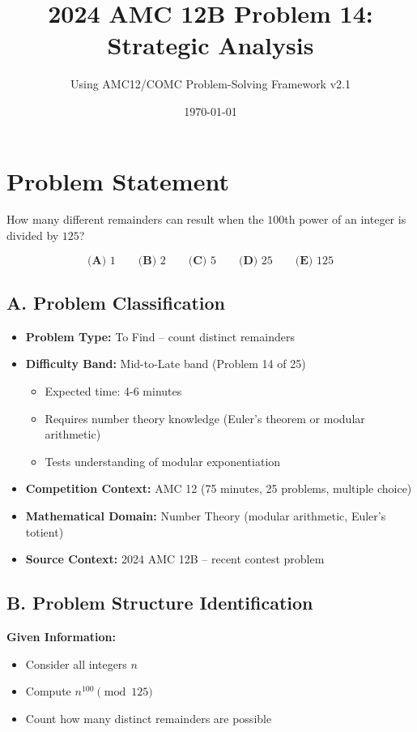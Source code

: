 \documentclass[12pt]{article}
\title{\textbf{2024 AMC 12B Problem 14:\\Strategic Analysis}}
\author{Using AMC12/COMC Problem-Solving Framework v2.1}
\date{\today}
\begin{document}
\maketitle

\section*{Problem Statement}

How many different remainders can result when the $100$th power of an integer is divided by $125$?

\[
\textbf{(A) } 1 \qquad 
\textbf{(B) } 2 \qquad 
\textbf{(C) } 5 \qquad 
\textbf{(D) } 25 \qquad 
\textbf{(E) } 125
\]

\vspace{1em}

\begin{problemconfigbox}
\subsection*{A. Problem Classification}

\begin{itemize}[leftmargin=*]
    \item \textbf{Problem Type:} To Find -- count distinct remainders
    \item \textbf{Difficulty Band:} Mid-to-Late band (Problem 14 of 25)
    \begin{itemize}
        \item Expected time: 4-6 minutes
        \item Requires number theory knowledge (Euler's theorem or modular arithmetic)
        \item Tests understanding of modular exponentiation
    \end{itemize}
    \item \textbf{Competition Context:} AMC 12 (75 minutes, 25 problems, multiple choice)
    \item \textbf{Mathematical Domain:} Number Theory (modular arithmetic, Euler's totient)
    \item \textbf{Source Context:} 2024 AMC 12B -- recent contest problem
\end{itemize}

\subsection*{B. Problem Structure Identification}

\textbf{Given Information:}
\begin{itemize}
    \item Consider all integers $n$
    \item Compute $n^{100} \pmod{125}$
    \item Count how many distinct remainders are possible
\end{itemize}


\end{problemconfigbox}
\end{document}
